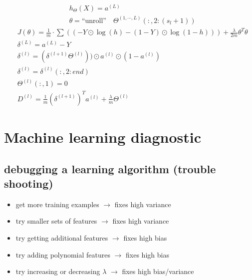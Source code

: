 \begin{itemize}
\begin{align*}
&h_{\Theta}(X) = a^{(L)}\\
&\theta = \text{``unroll''} \quad \Theta^{(1, \cdots, L)}(:, 2:(s_l+1))
\end{align*}
\begin{align} 
&J(\theta) = \frac{1}{m} \cdot \sum(\left(-Y \odot \log(h) - (1-Y) \odot \log(1-h)\right)) +\frac{\lambda}{2m}\theta^T\theta\\
&\delta^{(L)} = a^{(L)}-Y\\
&\delta^{(l)} = (\delta^{(l+1)}\Theta^{(l)})) \odot a^{(l)} \odot (1-a^{(l)})\\
&\delta^{(l)} = \delta^{(l)}(:, 2:end)\\
&\Theta^{(l)}(:,1) = 0\\
&D^{(l)} = \frac{1}{m}(\delta^{(l+1)})^{T}a^{(l)} + \frac{\lambda}{m}\Theta^{(l)}
\end{align}
\end{itemize}

\section{Machine learning diagnostic}
\label{sec:Machine learning diagnostic}
%
\subsection{debugging a learning algorithm (trouble shooting)}
\begin{itemize}
\item
get more training examples $\rightarrow$ fixes high variance
\item
try smaller sets of features $\rightarrow$ fixes high variance
\item
try getting additional features $\rightarrow$ fixes high bias
\item
try adding polynomial features $\rightarrow$ fixes high bias
\item
try increasing or decreasing $\lambda$ $\rightarrow$ fixes high bias/variance
\end{itemize}

%
